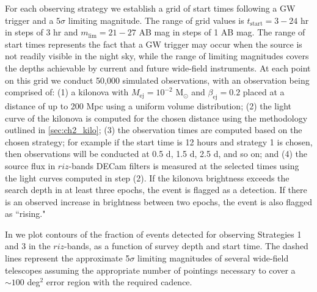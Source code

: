 For each observing strategy we establish a grid of start times following a GW trigger and a $5\sigma$ limiting magnitude. The range of grid values is $t_{\text{start}} = 3-24$ hr in steps of 3 hr and $m_{\text{lim}} = 21-27$ AB mag in steps of 1 AB mag. The range of start times represents the fact that a GW trigger may occur when the source is not readily visible in the night sky, while the range of limiting magnitudes covers the depths achievable by current and future wide-field instruments. At each point on this grid we conduct 50,000 simulated observations, with an observation being comprised of: (1) a kilonova with $M_{\text{ej}} = 10^{-2} \text{ M}_{\odot}$ and $\beta_{\text{ej}} = 0.2$ placed at a distance of up to 200 Mpc using a uniform volume distribution; (2) the light curve of the kilonova is computed for the chosen distance using the methodology outlined in \cref{sec:ch2_kilo}; (3) the observation times are computed based on the chosen strategy; for example if the start time is 12 hours and strategy 1 is chosen, then observations will be conducted at 0.5 d, 1.5 d, 2.5 d, and so on; and (4) the source flux in $riz$-bands DECam filters is measured at the selected times using the light curves computed in step (2). If the kilonova brightness exceeds the search depth in at least three epochs, the event is flagged as a detection. If there is an observed increase in brightness between two epochs, the event is also flagged as ``rising."

In  we plot contours of the fraction of events detected for observing Strategies 1 and 3 in the $riz$-bands, as a function of survey depth and start time. The dashed lines represent the approximate 5$\sigma$ limiting magnitudes of several wide-field telescopes assuming the appropriate number of pointings necessary to cover a $\sim 100$ deg$^2$ error region with the required cadence.

